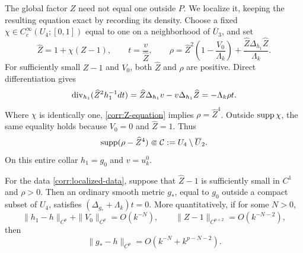 The global factor \(Z\) need not equal one outside \(P\).  We localize
it, keeping the resulting equation exact by recording its density.
Choose a fixed \(\chi\in C_c^\infty(U_4;[0,1])\) equal to one on a
neighborhood of \(\overline U_3\), and set
\begin{equation}\label{corr:localized-data}
 \widehat Z=1+\chi(Z-1),\qquad
 t=\frac v{\widehat Z},\qquad
 \rho=\widehat Z^2\left(1-\frac{V_0}{\Lambda_k}\right)
                +\frac{\widehat Z\Delta_{h_1}\widehat Z}{\Lambda_k}.
\end{equation}
For sufficiently small \(Z-1\) and \(V_0\), both \(\widehat Z\)
and \(\rho\) are positive.  Direct differentiation gives
\begin{equation}\label{corr:localized-flux}
 \operatorname{div}_{h_1}(\widehat Z^2h_1^{-1}dt)
       =\widehat Z\Delta_{h_1}v-v\Delta_{h_1}\widehat Z
       =-\Lambda_k\rho t.
\end{equation}
Where \(\chi\) is identically one, \eqref{corr:Z-equation} implies
\(\rho=\widehat Z^4\).  Outside \(\operatorname{supp}\chi\), the same equality
holds because \(V_0=0\) and \(\widehat Z=1\).  Thus
\begin{equation}\label{corr:defect-support}
 \operatorname{supp}(\rho-\widehat Z^4)
        \Subset \mathcal C:=U_4\setminus\overline U_2.
\end{equation}
On this entire collar \(h_1=g_0\) and \(v=u_k^0\).

\begin{lemma}\label{corr:localization}
For the data \eqref{corr:localized-data}, suppose that
\(\widehat Z-1\) is sufficiently small in \(C^1\) and
\(\rho>0\).  Then an ordinary smooth metric \(g_*\), equal to
\(g_0\) outside a compact subset of \(U_4\), satisfies
\((\Delta_{g_*}+\Lambda_k)t=0\).
More quantitatively, if for some \(N>0\),
\begin{equation}\label{corr:collar-input-estimate}
 \|h_1-h\|_{C^p}+\|V_0\|_{C^p}=O(k^{-N}),
 \qquad \|Z-1\|_{C^{p+2}}=O(k^{-N-2}),
\end{equation}
then
\begin{equation}\label{corr:final-metric-estimate}
 \|g_*-h\|_{C^p}
             =O(k^{-N}+k^{p-N-2}).
\end{equation}
\end{lemma}

